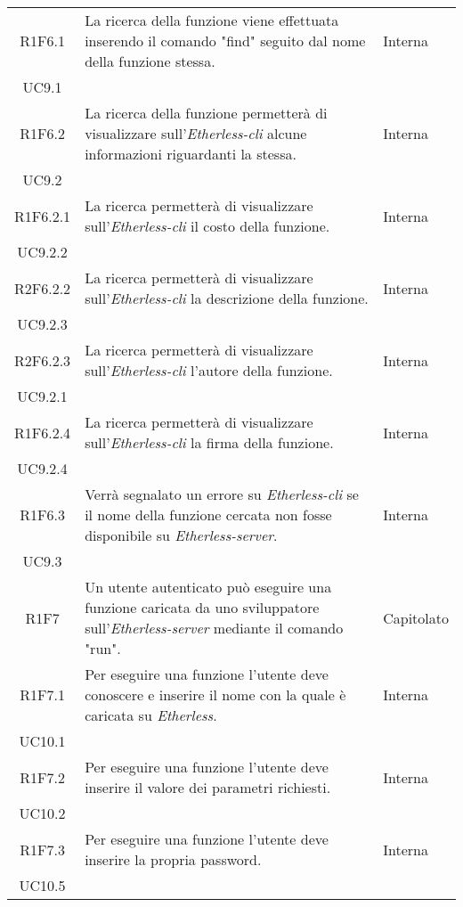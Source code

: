 \begin{longtable}{|c|p{8cm}|C{2cm}|}
	R1F6.1 &  La ricerca della funzione viene effettuata inserendo il comando "find" seguito dal nome della funzione stessa. & \centering Interna \\ UC9.1 \tabularnewline

	R1F6.2 &  La ricerca della funzione permetterà di visualizzare sull'\textit{Etherless-cli} alcune informazioni riguardanti la stessa.  & \centering Interna \\ UC9.2 \tabularnewline

	R1F6.2.1 &  La ricerca permetterà di visualizzare sull'\textit{Etherless-cli} il costo della funzione.  & \centering Interna \\ UC9.2.2 \tabularnewline

	R2F6.2.2 &  La ricerca permetterà di visualizzare sull'\textit{Etherless-cli} la descrizione della funzione.  & \centering Interna \\ UC9.2.3 \tabularnewline

	R2F6.2.3 &  La ricerca permetterà di visualizzare sull'\textit{Etherless-cli} l'autore della funzione.  & \centering Interna \\ UC9.2.1 \tabularnewline

	R1F6.2.4 &  La ricerca permetterà di visualizzare sull'\textit{Etherless-cli} la firma della funzione.  & \centering Interna \\ UC9.2.4 \tabularnewline

	R1F6.3 &  Verrà segnalato un errore su \textit{Etherless-cli} se il nome della funzione cercata non fosse disponibile su \textit{Etherless-server}.  & \centering Interna \\ UC9.3 \tabularnewline

	R1F7 &  Un utente autenticato può eseguire una funzione caricata da uno sviluppatore sull'\textit{Etherless-server} mediante il comando "run".  & Capitolato \\

	R1F7.1 &  Per eseguire una funzione l'utente deve conoscere e inserire il nome con la quale è caricata su \textit{Etherless}.  & \centering Interna \\ UC10.1 \tabularnewline

	R1F7.2 &  Per eseguire una funzione l'utente deve inserire il valore dei parametri richiesti.  & \centering Interna \\ UC10.2 \tabularnewline
	
	R1F7.3 & Per eseguire una funzione l'utente deve inserire la propria password. & \centering Interna \\ UC10.5 \tabularnewline


\end{longtable}
